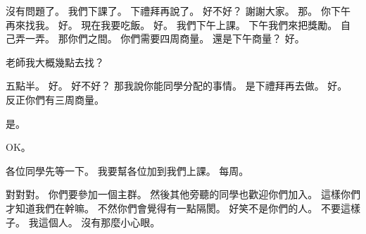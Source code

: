 \hypertarget{w01:cue:4153}{}沒有問題了。
\hypertarget{w01:cue:4154}{}我們下課了。
\hypertarget{w01:cue:4155}{}下禮拜再說了。
\hypertarget{w01:cue:4156}{}好不好？
\hypertarget{w01:cue:4157}{}謝謝大家。
\hypertarget{w01:cue:4158}{}那。
\hypertarget{w01:cue:4159}{}你下午再來找我。
\hypertarget{w01:cue:4160}{}好。
\hypertarget{w01:cue:4161}{}現在我要吃飯。
\hypertarget{w01:cue:4162}{}好。
\hypertarget{w01:cue:4163}{}我們下午上課。
\hypertarget{w01:cue:4164}{}下午我們來把獎勵。
\hypertarget{w01:cue:4165}{}自己弄一弄。
\hypertarget{w01:cue:4166}{}那你們之間。
\hypertarget{w01:cue:4167}{}你們需要四周商量。
\hypertarget{w01:cue:4168}{}還是下午商量？
\hypertarget{w01:cue:4169}{}好。

\hypertarget{w01:cue:4170}{}老師我大概幾點去找？

\hypertarget{w01:cue:4171}{}五點半。
\hypertarget{w01:cue:4172}{}好。
\hypertarget{w01:cue:4173}{}好不好？
\hypertarget{w01:cue:4174}{}那我說你能同學分配的事情。
\hypertarget{w01:cue:4175}{}是下禮拜再去做。
\hypertarget{w01:cue:4176}{}好。
\hypertarget{w01:cue:4177}{}反正你們有三周商量。

\hypertarget{w01:cue:4178}{}是。

\hypertarget{w01:cue:4179}{}OK。

\hypertarget{w01:cue:4180}{}各位同學先等一下。
\hypertarget{w01:cue:4181}{}我要幫各位加到我們上課。
\hypertarget{w01:cue:4182}{}每周。

\hypertarget{w01:cue:4183}{}對對對。
\hypertarget{w01:cue:4184}{}你們要參加一個主群。
\hypertarget{w01:cue:4185}{}然後其他旁聽的同學也歡迎你們加入。
\hypertarget{w01:cue:4186}{}這樣你們才知道我們在幹嘛。
\hypertarget{w01:cue:4187}{}不然你們會覺得有一點隔閡。
\hypertarget{w01:cue:4188}{}好笑不是你們的人。
\hypertarget{w01:cue:4189}{}不要這樣子。
\hypertarget{w01:cue:4190}{}我這個人。
\hypertarget{w01:cue:4191}{}沒有那麼小心眼。

